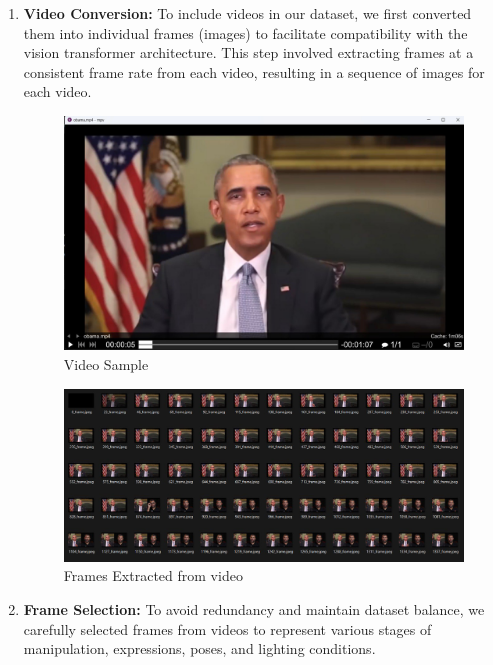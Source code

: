 \begin{enumerate}
    \item \textbf{Video Conversion:} To include videos in our dataset, we first converted them into individual frames (images) to facilitate compatibility with the vision transformer architecture. This step involved extracting frames at a consistent frame rate from each video, resulting in a sequence of images for each video.
          \begin{figure}[htbp]
              \centering
              \includegraphics[width= 5in ]{img/framesExtracted.jpg}
              \caption{Video Sample}
          \end{figure}
          \begin{figure}[ht]
              \centering
              \includegraphics[width= 5in ]{img/frames.jpg}
              \caption{Frames Extracted from video}
          \end{figure}
    \item \textbf{Frame Selection:} To avoid redundancy and maintain dataset balance, we carefully selected frames from videos to represent various stages of manipulation, expressions, poses, and lighting conditions.


\end{enumerate}
